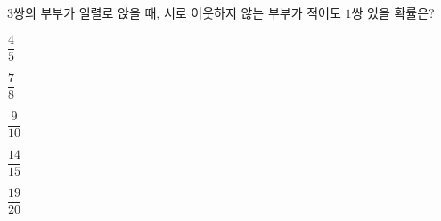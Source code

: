 $3$쌍의 부부가 일렬로 앉을 때, 서로 이웃하지 않는 부부가 적어도 $1$쌍 있을 확률은?
\begin{choices32}{\rule[-3ex]{0pt}{8ex}$\dfrac{4}{5}$}{\rule[-3ex]{0pt}{8ex}$\dfrac{7}{8}$}{\rule[-3ex]{0pt}{8ex}$\dfrac{9}{10}$}{\rule[-3ex]{0pt}{8ex}$\dfrac{14}{15}$}{\rule[-3ex]{0pt}{8ex}$\dfrac{19}{20}$}\end{choices32}
